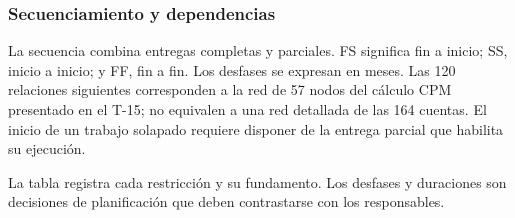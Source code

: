 \documentclass[11pt]{article}
\begin{document}
\subsubsection{Secuenciamiento y dependencias}

La secuencia combina entregas completas y parciales. FS significa fin a inicio; SS, inicio a inicio; y FF, fin a fin. Los desfases se expresan en meses. Las 120 relaciones siguientes corresponden a la red de 57 nodos del cálculo CPM presentado en el T-15; no equivalen a una red detallada de las 164 cuentas. El inicio de un trabajo solapado requiere disponer de la entrega parcial que habilita su ejecución.


La tabla registra cada restricción y su fundamento. Los desfases y duraciones son decisiones de planificación que deben contrastarse con los responsables.
\end{document}
